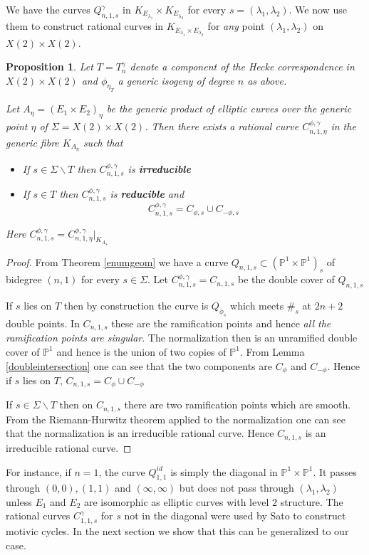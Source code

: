 \documentclass[11pt,a4paper]{article}
\newtheorem{prop}[defn]{Proposition}
\newcommand {\CP}{{\mathds P}}
\newcommand {\lb}{{\lambda}}
\newcommand {\CPP}{\CP^1 \times \CP^1}
\begin{document}
We have the curves $Q^{\gamma}_{n,1,s}$ in $K_{E_{\lb_1}}\times K_{E_{\lb_2}}$ for every $s=(\lb_1,\lb_2)$. We now use them to construct  rational curves in $K_{E_{\lb_1}\times E_{\lb_2}}$ for {\em any} point $(\lb_1,\lb_2)$ on $X(2) \times X(2)$. 


\begin{prop} Let $T=T^{\gamma}_n$ denote a component of the Hecke correspondence in $X(2) \times X(2)$ and $\phi_{\eta_T}$ a generic  isogeny of degree $n$ as above. 
	
Let $A_{\eta}=(E_{1} \times E_{2})_{\eta}$ be the generic product of elliptic curves over the generic point $\eta$ of $\Sigma=X(2) \times X(2)$. Then there  exists a rational curve $C^{\phi,\gamma}_{n,1,\eta}$ in the generic fibre $K_{A_{\eta}}$ such that 

	\begin{itemize}
		\item If $s \in \Sigma \backslash T$ then  $C^{\phi,\gamma}_{n,1,s}$ is {\bf irreducible}
		\item If $s \in T$  then $C^{\phi,\gamma}_{n,1,s}$ is {\bf reducible} and  
		$$C^{\phi,\gamma}_{n,1,s}=C_{\phi,s} \cup C_{-\phi,s}$$
		\end{itemize}
%
Here 	$C^{\phi,\gamma}_{n,1,s}=C^{\phi,\gamma}_{n,1,\eta}|_{K_{A_s}}	$
		\label{rationalcurve}
\end{prop}
%
\begin{proof} From Theorem \ref{enumgeom} we have a curve $Q_{n,1,s} \subset (\CPP)_s$ of bidegree $(n,1)$ for every $s\in\Sigma$. 
%
Let $C^{\phi,\gamma}_{n,1,s}=C_{n,1,s}$ be the double cover of $Q_{n,1,s}$ 

If $s$ lies on $T$ then by construction the curve is $Q_{\phi_s}$ which meets $\#_s$ at $2n+2$ double points. In $C_{n,1,s}$ these are the ramification points and hence {\em all the ramification points are singular}.  The  normalization then  is an unramified double cover of $\CP^1$ and hence is the union of two copies of $\CP^1$. From Lemma \ref{doubleintersection} one can see that the two components are $C_{\phi}$ and $C_{-\phi}$. Hence if $s$ lies on $T$, $C_{n,1,s}=C_{\phi} \cup C_{-\phi}$

If $s \in \Sigma\backslash T$ then on $C_{n,1,s}$ there are two ramification points which are smooth. From the Riemann-Hurwitz theorem applied to the normalization one can see that the normalization is an irreducible rational curve. Hence $C_{n,1,s}$ is an irreducible rational curve.





\end{proof}
%
For instance, if $n=1$, the curve $Q^{id}_{1,1}$ is simply the diagonal in $\CPP$. It passes through $(0,0),(1,1)$ and $(\infty,\infty)$ but does not pass through $(\lb_1,\lb_2)$ unless $E_1$ and $E_2$  are isomorphic as elliptic curves with level $2$ structure. The rational curves $C^{\gamma}_{1,1,s}$ for $s$ not in the diagonal  were used by Sato \cite{sato} to construct motivic cycles. In the next section we show that this can be generalized to our case. 
\end{document}
